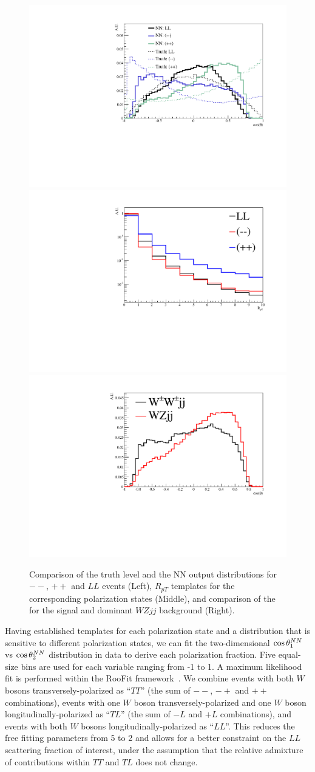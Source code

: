 \begin{figure}
\includegraphics[width=.32\textwidth]{./fig/1d_templates_graph_X.pdf}
\includegraphics[width=.32\textwidth]{./fig/ratios_LLRROO_graph.pdf}
\includegraphics[width=.32\textwidth]{./fig/1d_wz_bg_graph_X.pdf}
\caption{\label{fig:polarization_comparison} Comparison of the truth level \cts and the 
NN output \ctsNN distributions for $--$, $++$ and $LL$ events (Left), 
$R_{pT}$ templates for the corresponding polarization states (Middle), 
and comparison of the \ctsNN for the signal and dominant $WZjj$ background (Right).}
\end{figure}

Having established templates for each polarization state and a
distribution that is sensitive to different polarization states, 
we can fit the two-dimensional $ \cos \theta^{NN}  _1$ vs $ \cos \theta^{NN}  _2$
distribution in data to derive each polarization fraction. Five equal-size bins 
are used for each \ctsNN variable ranging from -1 to 1. A maximum likelihood fit is performed 
within the RooFit framework~\cite{RooFit}. We combine events with both $W$ bosons transversely-polarized as
``$TT$'' (the sum of $--$, $-+$ and $++$ combinations), events with
one $W$ boson transversely-polarized and one $W$ boson
longitudinally-polarized as ``$TL$'' (the sum of $-L$ and $+L$
combinations), and events with both $W$ bosons
longitudinally-polarized as ``$LL$''. This reduces the free fitting parameters from 5 to 2 and 
allows for a better constraint on the $LL$ scattering fraction of interest, under the assumption that
the relative admixture of contributions within $TT$ and $TL$ does not change. 

